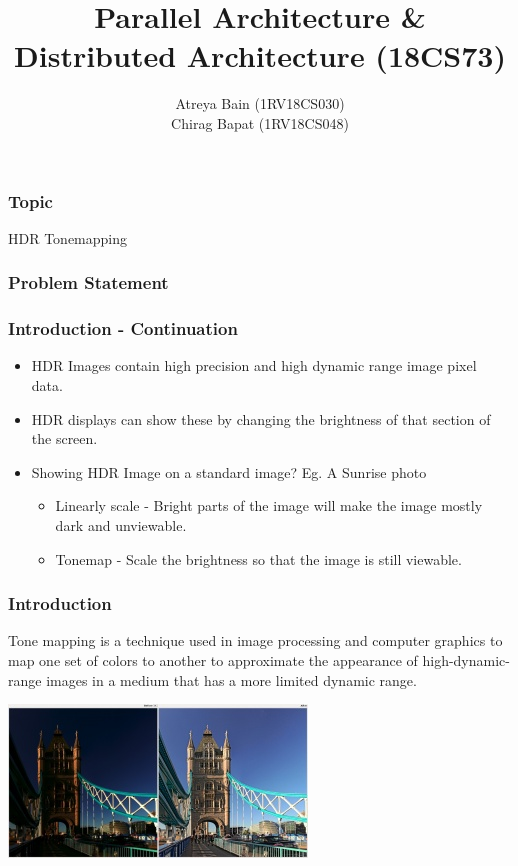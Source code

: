 \documentclass{beamer}
\title{Parallel Architecture \& Distributed Architecture (18CS73)}
\author{Atreya Bain (1RV18CS030)\\Chirag Bapat (1RV18CS048)}
\institute[RVCE]
{
    Submitted To: Dr. Minal Moharir\\
    Associate Professor
    \and
    Self Study Assignment
}
\newcommand{\problemtitle}[0]{HDR Tonemapping}
\begin{document}
\frame{\maketitle}



\begin{frame}
    \frametitle{Topic}
    \begin{center}
        \LARGE{\problemtitle}
    \end{center}
\end{frame}


\begin{frame}
    \frametitle{Problem Statement}
    
\end{frame}


\begin{frame}
    \frametitle{Introduction - Continuation}
    \begin{itemize}
        \item HDR Images contain high precision and high dynamic range image pixel data.
        \item HDR displays can show these by changing the brightness of that section of the screen.
        \item Showing HDR Image on a standard image? Eg. A Sunrise photo
        \begin{itemize}
            \item Linearly scale - Bright parts of the image will make the image mostly dark and unviewable.
            \item Tonemap - Scale the brightness so that the image is still viewable.
        \end{itemize}
    \end{itemize}
\end{frame}

\begin{frame}
    \frametitle{Introduction}
    Tone mapping is a technique used in image processing and computer graphics to map one set of colors to another to approximate the appearance of high-dynamic-range images in a medium that has a more limited dynamic range.
    
    \begin{center}
        \includegraphics[width=.75\textwidth]{media/300px-Rt407-ba-tonemapping-hdr-cropped.jpg}
    \end{center}
\end{frame}
\end{document}
